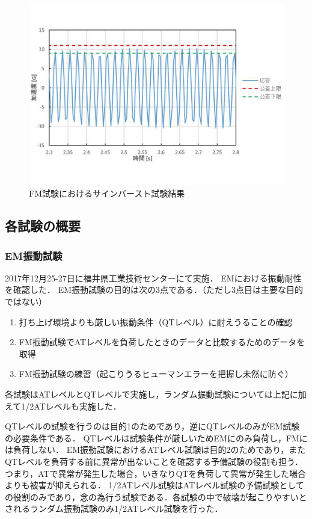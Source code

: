 \begin{figure}[H]
	\centering
	\includegraphics[width=1\linewidth]{04/fig/4-3-6.pdf}
	\caption{FM試験におけるサインバースト試験結果\cite{FM_vibration_test_report}}
	\label{fig4-3-1}
\end{figure}


\subsection{各試験の概要}
\subsubsection{EM振動試験}
2017年12月25-27日に福井県工業技術センターにて実施．
EMにおける振動耐性を確認した．
EM振動試験の目的は次の3点である．（ただし3点目は主要な目的ではない）
\begin{enumerate}
	\item 打ち上げ環境よりも厳しい振動条件（QTレベル）に耐えうることの確認
	\item FM振動試験でATレベルを負荷したときのデータと比較するためのデータを取得
	\item FM振動試験の練習（起こりうるヒューマンエラーを把握し未然に防ぐ）
\end{enumerate}
各試験はATレベルとQTレベルで実施し，ランダム振動試験については上記に加えて1/2ATレベルも実施した．

QTレベルの試験を行うのは目的1のためであり，逆にQTレベルのみがEM試験の必要条件である．
QTレベルは試験条件が厳しいためEMにのみ負荷し，FMには負荷しない．
EM振動試験におけるATレベル試験は目的2のためであり，またQTレベルを負荷する前に異常が出ないことを確認する予備試験の役割も担う．つまり，ATで異常が発生した場合，いきなりQTを負荷して異常が発生した場合よりも被害が抑えられる．
1/2ATレベル試験はATレベル試験の予備試験としての役割のみであり，念の為行う試験である．各試験の中で破壊が起こりやすいとされるランダム振動試験のみ1/2ATレベル試験を行った．

